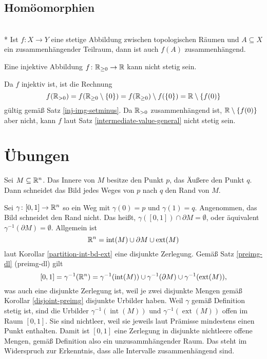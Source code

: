 \subsection{Homöomorphien}
\begin{Satz}%
\label{intermediate-value-general}\mbox{}\\*
Ist $f\colon X\to Y$ eine stetige Abbildung zwischen topologischen
Räumen und $A\subseteq X$ ein zusammenhängender Teilraum,
dann ist auch $f(A)$ zusammenhängend.
\end{Satz}

\begin{Satz}
Eine injektive Abbildung $f\colon\mathbb R_{\ge 0}\to\mathbb R$ kann nicht stetig sein.
\end{Satz}
\begin{Beweis}
Da $f$ injektiv ist, ist die Rechnung
\[f(\mathbb R_{>0}) = f(\mathbb R_{\ge 0}\setminus\{0\})
= f(\mathbb R_{\ge 0})\setminus f(\{0\}) = \mathbb R\setminus\{f(0)\}\]
gültig gemäß Satz \ref{inj-img-setminus}. Da $\mathbb R_{>0}$ zusammenhängend
ist, $\mathbb R\setminus\{f(0)\}$ aber nicht, kann $f$ laut Satz
\ref{intermediate-value-general} nicht stetig sein.\,\qedsymbol
\end{Beweis}

\section{Übungen}

\begin{Satz}
Sei $M\subseteq\mathbb R^n$. Das Innere von $M$ besitze den Punkt $p$,
das Äußere den Punkt $q$. Dann schneidet das Bild jedes Weges von $p$
nach $q$ den Rand von $M$.
\end{Satz}
\begin{Beweis}[Beweis 1]
Sei $\gamma\colon [0,1]\to\mathbb R^n$ so ein Weg mit
$\gamma(0)=p$ und $\gamma(1)=q$. Angenommen, das Bild schneidet
den Rand nicht. Das heißt, $\gamma([0,1])\cap\partial M = \emptyset$,
oder äquivalent $\gamma^{-1}(\partial M)=\emptyset$.
Allgemein ist
\[\mathbb R^n = \operatorname{int}(M) \cup \partial M \cup \operatorname{ext}(M)\]
laut Korollar \ref{partition-int-bd-ext} eine disjunkte Zerlegung.
Gemäß Satz \ref{preimg-dl} (preimg-dl) gilt
\[[0,1] = \gamma^{-1}(\mathbb R^n) = \gamma^{-1}(\operatorname{int}(M))
\cup \gamma^{-1}(\partial M)\cup \gamma^{-1}(\operatorname{ext}(M)),\]
was auch eine disjunkte Zerlegung ist, weil je zwei disjunkte Mengen
gemäß Korollar \ref{disjoint-preimg} disjunkte Urbilder haben.
Weil $\gamma$ gemäß Definition stetig ist,
sind die Urbilder $\gamma^{-1}(\operatorname{int}(M))$ und
$\gamma^{-1}(\operatorname{ext}(M))$ offen im Raum $[0,1]$. Sie sind
nichtleer, weil sie jeweils laut Prämisse mindestens einen Punkt
enthalten. Damit ist $[0,1]$ eine Zerlegung in disjunkte nichtleere
offene Mengen, gemäß Definition also ein unzusammhängender Raum. Das
steht im Widerspruch zur Erkenntnis, dass alle Intervalle
zusammenhängend sind.\,\qedsymbol
\end{Beweis}

